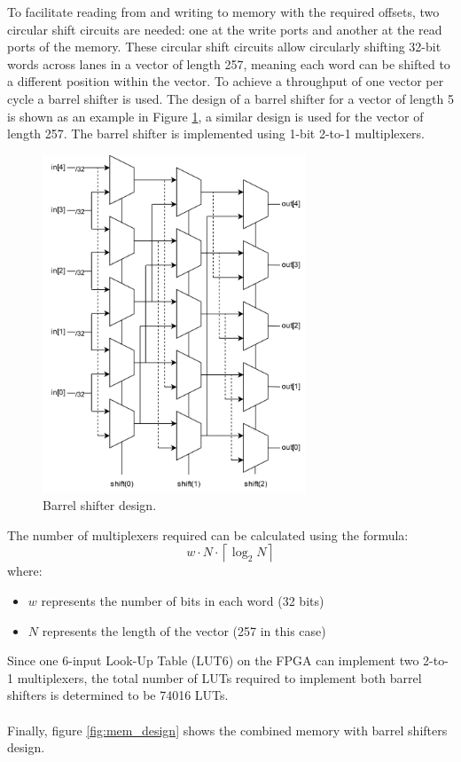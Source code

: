 \documentclass[english,master=eelt,masteroption=ec]{kulemt}
\begin{document}
To facilitate reading from and writing to memory with the required offsets, two circular shift circuits are needed: one at the write ports and another at the read ports of the memory. These circular shift circuits allow circularly shifting 32-bit words across lanes in a vector of length 257, meaning each word can be shifted to a different position within the vector. To achieve a throughput of one vector per cycle a barrel shifter is used. The design of a barrel shifter for a vector of length 5 is shown as an example in Figure \ref{fig:barrel_shifter}, a similar design is used for the vector of length 257. The barrel shifter is implemented using 1-bit 2-to-1 multiplexers.

\begin{figure}[h]
\centering
\includegraphics[width=0.7\textwidth]{img/barrel_shifter.png}
\caption{Barrel shifter design.}
\label{fig:barrel_shifter}
\end{figure}

\FloatBarrier

The number of multiplexers required can be calculated using the formula:
\[w \cdot N \cdot \left \lceil \log_2 N \right \rceil\]
where:
\begin{itemize}
\item{$w$ represents the number of bits in each word (32 bits)}
\item{$N$ represents the length of the vector (257 in this case)}
\end{itemize}
Since one 6-input Look-Up Table (LUT6) on the FPGA can implement two 2-to-1 multiplexers, the total number of LUTs required to implement both barrel shifters is determined to be 74016 LUTs.
\\\\
Finally, figure \ref{fig:mem_design} shows the combined memory with barrel shifters design.
\end{document}
